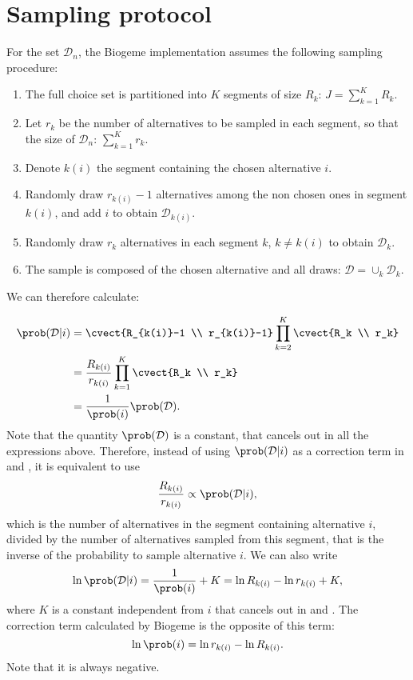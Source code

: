 \documentclass[12pt,a4paper]{article}
\begin{document}
\section{Sampling protocol}
\label{sec:protocol}

For the set $\mathcal{D}_n$, the Biogeme implementation assumes the following sampling procedure:

\begin{enumerate}
  \item The full  choice set is partitioned into $K$ segments of size $R_k$: $J=\sum_{k=1}^K R_k$.
  \item Let $r_k$ be the number of alternatives to be sampled in each segment, so that the size of $\mathcal{D}_n$: $\sum_{k=1}^K r_k$.
  \item Denote $k(i)$ the segment containing the chosen alternative $i$.
  \item Randomly draw $r_{k(i)}-1$ alternatives among the non chosen ones in segment $k(i)$, and add $i$ to obtain $\mathcal{D}_{k(i)}$.
  \item Randomly draw $r_k$ alternatives in each segment $k$, $k\neq k(i)$ to obtain $\mathcal{D}_k$.
  \item The sample is composed of the chosen alternative and all draws: $\mathcal{D} = \cup_k \mathcal{D}_k$.
\end{enumerate}

We can therefore calculate:

\begin{align*}
      \prob(\mathcal{D} | i) &= \cvect{R_{k(i)}-1 \\ r_{k(i)}-1} \prod_{k=2}^K \cvect{R_k \\ r_k} \\
      &= \frac{R_{k(i)}}{r_{k(i)}} \prod_{k=1}^K \cvect{R_k \\ r_k} \\
        &= \frac{1}{\prob(i)} \prob(\mathcal{D}).
\end{align*}
Note that the quantity $\prob(\mathcal{D})$ is a constant, that cancels out in all the expressions above. Therefore, instead of using $\prob(\mathcal{D} | i)$ as a correction term in  and , it is equivalent to use
\begin{equation}
\frac{R_{k(i)}}{r_{k(i)}}  \propto \prob(\mathcal{D} | i),
\end{equation}
which is the number of alternatives in the segment containing alternative $i$, divided by the number of alternatives sampled from this segment, that is the inverse of the probability to sample alternative $i$. We can also write
\begin{equation}
\ln \prob(\mathcal{D} | i) = \frac{1}{\prob(i)} + K = \ln R_{k(i)} - \ln r_{k(i)} + K,
\end{equation}
where $K$ is a constant independent from $i$ that cancels out  in  and .
The correction term calculated by Biogeme is the opposite of this term:
\begin{equation}
  \label{eq:alt_sampling_proba}
\ln \prob(i) = \ln r_{k(i)} - \ln R_{k(i)}.
\end{equation}
Note that it is always negative.
\end{document}
